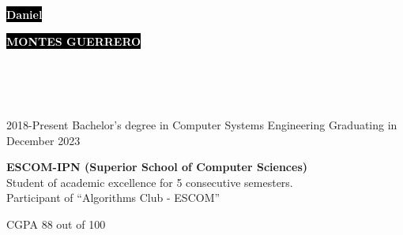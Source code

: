 \documentclass[9pt]{developercv} %
\begin{document}

\begin{minipage}[t]{0.70\textwidth} %
	\vspace{-\baselineskip} %
	
	\colorbox{black}{{\HUGE\textcolor{white}{\textbf{{Daniel}}}}} %
	
	\colorbox{black}{{\HUGE\textcolor{white}{\textbf{{MONTES GUERRERO}}}}} %
	
	\vspace{6pt}
\end{minipage}
\begin{minipage}[t]{0.3\textwidth} %
	\vspace{-\baselineskip} %
	
	\\
	\\
	\\
\end{minipage}



\begin{entrylist}
	\entry
		{2018-Present}
		{Bachelor’s degree in Computer Systems Engineering}
		{Graduating in December 2023}
		{\textbf{ESCOM-IPN (Superior School of Computer Sciences)}\\
		Student of academic excellence for 5 consecutive semesters.\\
		Participant of ``Algorithms Club - ESCOM''
		 \begin{flushright}
		 	CGPA 88 out of 100
		 \end{flushright}
		}
\end{entrylist}
\end{document}

